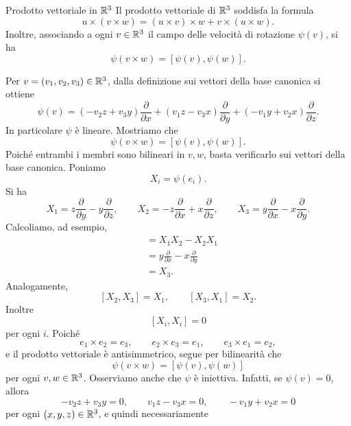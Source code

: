 \documentclass[a4paper]{article}
\begin{document}
\begin{snippetproposition}{Prodotto vettoriale in \(\mathbb{R}^3\)}
    Il prodotto vettoriale di \(\mathbb{R}^3\) soddisfa la formula
    \[
        u\times(v\times w)
        =
        (u\times v)\times w+v\times(u\times w).
    \]
    Inoltre, associando a ogni \(v\in\mathbb{R}^3\) il campo delle velocità di
    rotazione \(\psi(v)\), si ha
    \[
        \psi(v\times w)=[\psi(v),\psi(w)].
    \]
\end{snippetproposition}

\begin{snippetproof}{}
    Per \(v=(v_1,v_2,v_3)\in\mathbb{R}^3\), dalla definizione sui vettori della base canonica si ottiene
    \[
        \psi(v)
        =
        (-v_2z+v_3y)\frac{\partial}{\partial x}
        +(v_1z-v_3x)\frac{\partial}{\partial y}
        +(-v_1y+v_2x)\frac{\partial}{\partial z}.
    \]
    In particolare \(\psi\) è lineare. Mostriamo che
    \[
        \psi(v\times w)=[\psi(v),\psi(w)].
    \]
    Poiché entrambi i membri sono bilineari in \(v,w\), basta verificarlo sui vettori della base canonica. Poniamo
    \[
        X_i=\psi(e_i).
    \]
    Si ha
    \[
        X_1=z\frac{\partial}{\partial y}-y\frac{\partial}{\partial z},
        \qquad
        X_2=-z\frac{\partial}{\partial x}+x\frac{\partial}{\partial z},
        \qquad
        X_3=y\frac{\partial}{\partial x}-x\frac{\partial}{\partial y}.
    \]
    Calcoliamo, ad esempio,
    \begin{align*}
        [X_1,X_2]
        &=
        X_1X_2-X_2X_1\\
        &=
        y\frac{\partial}{\partial x}-x\frac{\partial}{\partial y}\\
        &=
        X_3.
    \end{align*}
    Analogamente,
    \[
        [X_2,X_3]=X_1,
        \qquad
        [X_3,X_1]=X_2.
    \]
    Inoltre
    \[
        [X_i,X_i]=0
    \]
    per ogni \(i\). Poiché
    \[
        e_1\times e_2=e_3,
        \qquad
        e_2\times e_3=e_1,
        \qquad
        e_3\times e_1=e_2,
    \]
    e il prodotto vettoriale è antisimmetrico, segue per bilinearità che
    \[
        \psi(v\times w)=[\psi(v),\psi(w)]
    \]
    per ogni \(v,w\in\mathbb{R}^3\).
    Osserviamo anche che \(\psi\) è iniettiva. Infatti, se \(\psi(v)=0\), allora
    \[
        -v_2z+v_3y=0,
        \qquad
        v_1z-v_3x=0,
        \qquad
        -v_1y+v_2x=0
    \]
    per ogni \((x,y,z)\in\mathbb{R}^3\), e quindi necessariamente

\end{snippetproof}
\end{document}

